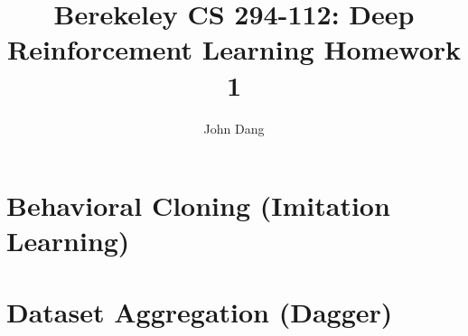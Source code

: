 \documentclass{article}
\title{Berekeley CS 294-112: Deep Reinforcement Learning Homework 1}
\author{John Dang}
\date{}
\begin{document}
\maketitle
    \section{Behavioral Cloning (Imitation Learning)}

    \section{Dataset Aggregation (Dagger)}
\end{document}
